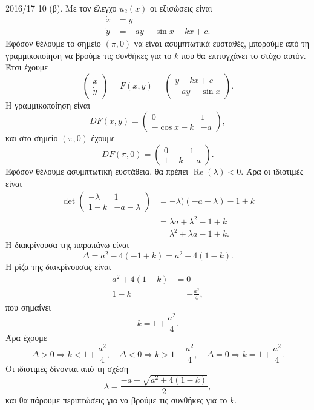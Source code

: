\begin{solution}{2016/17 10}
    (β). Με τον έλεγχο \( u_2(x) \) οι εξισώσεις είναι
    \begin{align*}
        \dot{x} &= y \\
        \dot{y} &= -a y - \sin{x} - kx + c.
    \end{align*}
    Εφόσον θέλουμε το σημείο \( (\pi, 0) \) να είναι ασυμπτωτικά ευσταθές,
    μπορούμε από τη γραμμικοποίηση να βρούμε τις συνθήκες για το \( k \) που θα
    επιτυγχάνει το στόχο αυτόν. Έτσι έχουμε
    \[
        \begin{pmatrix}
            \dot{x} \\
            \dot{y}
        \end{pmatrix} = F(x, y) =
        \begin{pmatrix}
            y -kx + c \\
            -a y - \sin{x}
        \end{pmatrix}.
    \]
    Η γραμμικοποίηση είναι
    \[
        DF(x, y) =
        \begin{pmatrix}
            0 & 1 \\
            -\cos{x} - k & -a
        \end{pmatrix},
    \]
    και στο σημείο \( (\pi, 0) \) έχουμε
    \[
        DF(\pi, 0) =
        \begin{pmatrix}
            0 & 1 \\
            1 - k & -a
        \end{pmatrix}.
    \]
    Εφόσον θέλουμε ασυμπτωτική ευστάθεια, θα πρέπει \(
    \operatorname{Re}(\lambda) < 0 \). Άρα οι ιδιοτιμές είναι
    \begin{align*}
        \det{\begin{pmatrix}
                -\lambda & 1 \\
                1 - k & -a - \lambda
        \end{pmatrix}} &=
        -\lambda)(-a - \lambda) - 1 + k \\
        &= \lambda a + \lambda^2 - 1 + k \\
        &= \lambda^2 + \lambda a - 1 + k.
    \end{align*}
    Η διακρίνουσα της παραπάνω είναι
    \[
        \Delta = a^2 - 4(-1 + k) = a^2 + 4(1 - k).
    \]
    Η ρίζα της διακρίνουσας είναι
    \begin{align*}
        a^2 + 4(1 - k) &= 0 \\
        1 - k &= -\frac{a^2}{4},
    \end{align*}
    που σημαίνει
    \[
        k = 1 + \frac{a^2}{4}.
    \]
    Άρα έχουμε
    \[
        \Delta > 0 \Rightarrow k < 1 + \frac{a^2}{4}, \quad
        \Delta < 0 \Rightarrow k > 1 + \frac{a^2}{4}, \quad
        \Delta = 0 \Rightarrow k = 1 + \frac{a^2}{4}.
    \]
    Οι ιδιοτιμές δίνονται από τη σχέση
    \begin{equation}\label{eq:ex10b_lambda}
        \lambda = \frac{-a \pm\sqrt{a^2 + 4(1 - k)}}{2},
    \end{equation}
    και θα πάρουμε περιπτώσεις για να βρούμε τις συνθήκες για το \( k \).


\end{solution}
